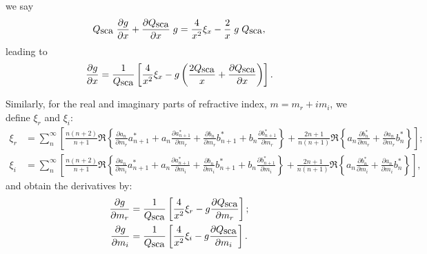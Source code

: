 \documentclass[a4paper,10pt]{article}
\def \Qsca { {Q_{\mbox{\rm sca}}}}
\def \asym { {g} }
\begin{document}
we say
\begin{align}
 \Qsca \; \frac{\partial \asym}{\partial x} + \frac{\partial \Qsca}{\partial x}\;\asym = \frac{4}{x^2} \xi_x - \frac{2}{x}\;\asym\;\Qsca,
\end{align}
leading to
\begin{align}
\frac{\partial \asym}{\partial x} =
                 \frac{1}{\Qsca}\left[ \frac{4}{x^2} \xi_x - \asym\left(\frac{2\Qsca}{x} + \frac{\partial \Qsca}{\partial x}\right)\right].\label{eq:dgdx}
\end{align}




Similarly, for the real and imaginary parts of refractive index, $m=m_r + i m_i$, we define $\xi_r$ and $\xi_i$:
\begin{align}
 \xi_r &= \sum_n^\infty \left[  \frac{n(n+2)}{n+1} \Re \left\{
                                                                \frac{\partial a_n}{\partial m_r} a^*_{n+1} +
                                                                a_n \frac{\partial a^*_{n+1}}{\partial m_r}  +
                                                                \frac{\partial b_n}{\partial m_r} b^*_{n+1}  +
                                                                b_n \frac{\partial b^*_{n+1}}{\partial m_r}
                                                       \right\}
                               + \frac{2n+1}{n(n+1)} \Re \left\{ a_n \frac{\partial b^*_n}{\partial m_r} +
                                    \frac{\partial a_n}{\partial m_r} b^*_n  \right\}\right];\\
 \xi_i &= \sum_n^\infty \left[  \frac{n(n+2)}{n+1} \Re \left\{
                                                                \frac{\partial a_n}{\partial m_i} a^*_{n+1} +
                                                                a_n \frac{\partial a^*_{n+1}}{\partial m_i}  +
                                                                \frac{\partial b_n}{\partial m_i} b^*_{n+1}  +
                                                                b_n \frac{\partial b^*_{n+1}}{\partial m_i}
                                                       \right\}
                               + \frac{2n+1}{n(n+1)} \Re \left\{ a_n \frac{\partial b^*_n}{\partial m_i} +
                                    \frac{\partial a_n}{\partial m_i} b^*_n  \right\}\right],
\end{align}
and obtain the derivatives by:
\begin{align}
 \frac{\partial \asym}{\partial m_r} &= \frac{1}{\Qsca} \left[ \frac{4}{x^2} \xi_r - \asym \frac{\partial \Qsca}{\partial m_r} \right];\label{eq:dgdn}\\
 \frac{\partial \asym}{\partial m_i} &= \frac{1}{\Qsca} \left[ \frac{4}{x^2} \xi_i - \asym \frac{\partial \Qsca}{\partial m_i} \right]. \label{eq:dgdk}
\end{align}
\end{document}
